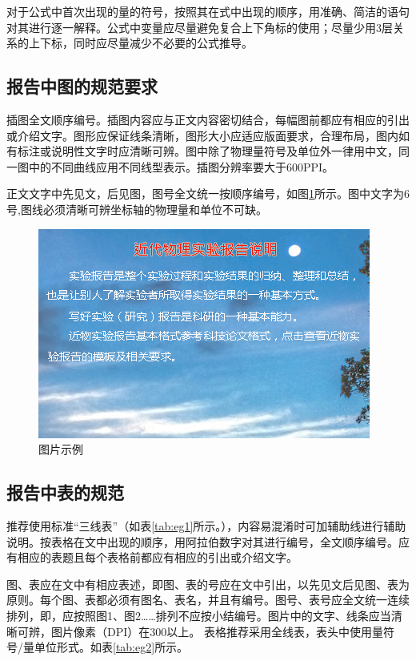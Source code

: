 \documentclass{gjm_report}
\begin{document}
\begin{multicols}{2}
  对于公式中首次出现的量的符号，按照其在式中出现的顺序，用准确、简洁的语句对其进行逐一解释。公式中变量应尽量避免复合上下角标的使用；尽量少用3层关系的上下标，同时应尽量减少不必要的公式推导。

  \subsection{报告中图的规范要求}
  插图全文顺序编号。插图内容应与正文内容密切结合，每幅图前都应有相应的引出或介绍文字。图形应保证线条清晰，图形大小应适应版面要求，合理布局，图内如有标注或说明性文字时应清晰可辨。图中除了物理量符号及单位外一律用中文，同一图中的不同曲线应用不同线型表示。插图分辨率要大于600PPI。

  正文文字中先见文，后见图，图号全文统一按顺序编号，如图\ref{fig:eg}所示。图中文字为6号,图线必须清晰可辨坐标轴的物理量和单位不可缺。

  \begin{figure}[H]
  \centering
    \includegraphics[width=0.8\linewidth]{./images/example.jpg}
  \caption{图片示例} \label{fig:eg}
  \end{figure}


  \subsection{报告中表的规范}
  推荐使用标准“三线表”（如表\ref{tab:eg1}所示。），内容易混淆时可加辅助线进行辅助说明。按表格在文中出现的顺序，用阿拉伯数字对其进行编号，全文顺序编号。应有相应的表题且每个表格前都应有相应的引出或介绍文字。

  图、表应在文中有相应表述，即图、表的号应在文中引出，以先见文后见图、表为原则。每个图、表都必须有图名、表名，并且有编号。图号、表号应全文统一连续排列，即，应按照图1、图2……排列不应按小结编号。图片中的文字、线条应当清晰可辨，图片像素（DPI）在300以上。
  表格推荐采用全线表，表头中使用量符号/量单位形式。如表\ref{tab:eg2}所示。


\end{multicols}
\end{document}
